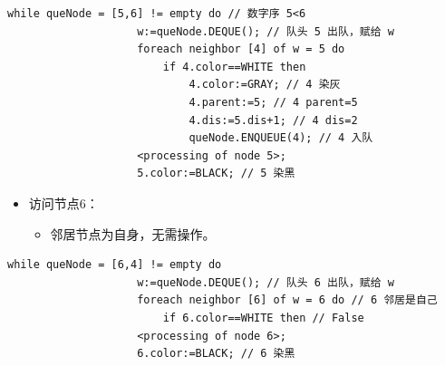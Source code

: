 \documentclass{article}
\begin{document}
\begin{enumerate}
        \begin{lstlisting}[style=algorithmPPT]
                while queNode = [5,6] != empty do // 数字序 5<6
                    w:=queNode.DEQUE(); // 队头 5 出队，赋给 w
                    foreach neighbor [4] of w = 5 do
                        if 4.color==WHITE then
                            4.color:=GRAY; // 4 染灰
                            4.parent:=5; // 4 parent=5
                            4.dis:=5.dis+1; // 4 dis=2
                            queNode.ENQUEUE(4); // 4 入队
                    <processing of node 5>;
                    5.color:=BLACK; // 5 染黑
                \end{lstlisting}    
        \begin{itemize}
            \item 访问节点6：
            \begin{itemize}
                \item 邻居节点为自身，无需操作。
            \end{itemize}
        \end{itemize}


        \begin{lstlisting}[style=algorithmPPT]
                while queNode = [6,4] != empty do
                    w:=queNode.DEQUE(); // 队头 6 出队，赋给 w
                    foreach neighbor [6] of w = 6 do // 6 邻居是自己
                        if 6.color==WHITE then // False 
                    <processing of node 6>;
                    6.color:=BLACK; // 6 染黑        
                \end{lstlisting}  
                    
        \begin{figure}[htbp]
            \begin{minipage}[b]{0.6\textwidth}    %
                \centering
\end{minipage}
\end{figure}
\end{enumerate}
\end{document}
